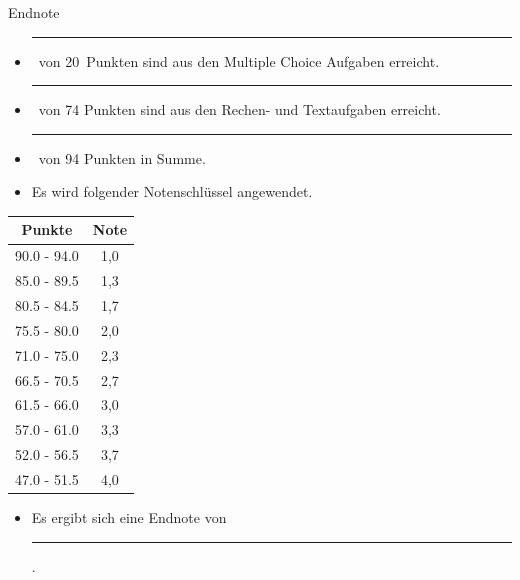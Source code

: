 \documentclass[a4paper, 9pt]{scrartcl}\usepackage[]{graphicx}\usepackage[]{xcolor}
\begin{document}
\begin{graybox}{Endnote}
  \vspace{1Ex}
  \begin{itemize}
  \item[] \rule[0ex]{3em}{.4pt}\, von 20\, Punkten sind aus den Multiple
    Choice Aufgaben erreicht.
  \item[] \rule[0ex]{3em}{.4pt}\, von 74 Punkten sind aus den Rechen- und
    Textaufgaben erreicht. 
  \item[] \rule[0ex]{3em}{.4pt}\, von 94 Punkten in Summe.
  \item[] Es wird folgender Notenschlüssel angewendet.   
  \end{itemize}
  \vspace{1ex}
\begin{center}
  \begin{tabular}[c]{cc}
    \toprule
    \textbf{Punkte}	&	\textbf{Note}	\\
    \midrule
    90.0 - 94.0	&	1,0	\\
    85.0 - 89.5	&	1,3	\\
    80.5 - 84.5	&	1,7	\\
    75.5 - 80.0	&	2,0	\\
    71.0 - 75.0	&	2,3	\\
    66.5 - 70.5	&	2,7	\\
    61.5 - 66.0	&	3,0	\\
    57.0 - 61.0	&	3,3	\\
    52.0 - 56.5	&	3,7	\\
    47.0 - 51.5	&	4,0	\\
    \bottomrule
  \end{tabular}
\end{center}
  \vspace{1ex}
\begin{itemize}
\item[] Es ergibt sich eine Endnote von \rule[0ex]{4em}{.4pt}.
\end{itemize}
  \vspace{1Ex}
\end{graybox}

\newpage
\end{document}
